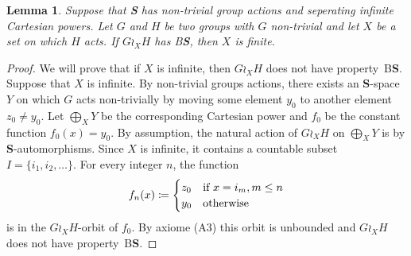 \documentclass[a4paper]{article}
\newtheorem{lem}{Lemma}[section]
\theoremstyle{definition}
\newcommand*{\category}[1]{\textbf{#1}}
\newcommand*{\CatS}{\category{S}}
\newcommand*{\BS}{B\textbf{S}}
\newcommand*{\FW}{FW}
\newcommand*{\powerset}[1]{\mathcal P(#1)}
\begin{document}
%
%
\begin{lem}\label{Lemma:XFinite}
Suppose that \CatS{} has non-trivial group actions and seperating infinite Cartesian powers.
Let $G$ and $H$ be two groups with $G$ non-trivial and let $X$ be a set on which $H$ acts.
If $G\wr_XH$ has \BS, then $X$ is finite.
\end{lem}
\begin{proof}
We will prove that if $X$ is infinite, then $G\wr_XH$ does not have property~\BS. Suppose that $X$ is infinite.
By non-trivial groups actions, there exists an \CatS-space $Y$ on which $G$ acts non-trivially by moving some element $y_0$ to another element $z_0\neq y_0$.
Let $\bigoplus_XY$ be the corresponding Cartesian power and $f_0$ be the constant function $f_0(x)=y_0$.
By assumption, the natural action of $G\wr_XH$ on $\bigoplus_XY$ is by \CatS-automorphisms.
Since $X$ is infinite, it contains a countable subset $I=\{i_1,i_2,\dots\}$.
For every integer $n$, the function
\[
	f_n(x)\coloneqq
	\begin{cases}
		z_0 & \textnormal{if } x=i_m, m\leq n\\
		y_0 & \textnormal{otherwise}
	\end{cases}
\]
is in the $G\wr_XH$-orbit of $f_0$. By axiome (A3) this orbit is unbounded and $G\wr_XH$ does not have property~\BS.
%
%
\end{proof}
%
%
\end{document}
